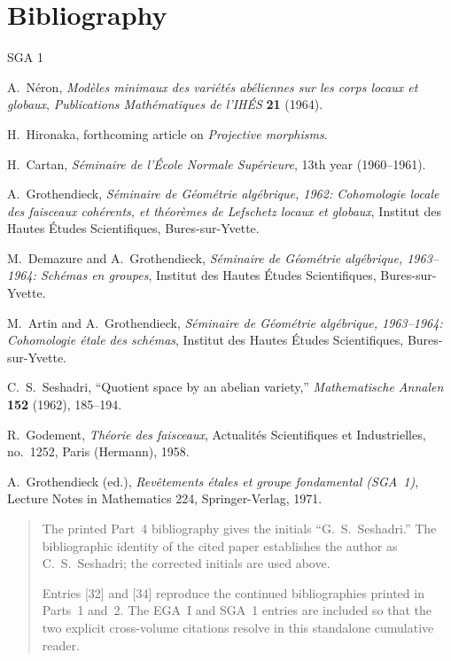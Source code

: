 \clearpage
{}
{}
\section*{Bibliography}

\begin{thebibliography}{SGA 1}

A.~N\'eron, \emph{Mod\`eles minimaux des vari\'et\'es ab\'eliennes sur les
corps locaux et globaux}, \emph{Publications Math\'ematiques de l'IH\'ES}
\textbf{21} (1964).

H.~Hironaka, forthcoming article on \emph{Projective morphisms}.

H.~Cartan, \emph{S\'eminaire de l'\'Ecole Normale Sup\'erieure},
13th year (1960--1961).

A.~Grothendieck, \emph{S\'eminaire de G\'eom\'etrie alg\'ebrique, 1962:
Cohomologie locale des faisceaux coh\'erents, et th\'eor\`emes de Lefschetz
locaux et globaux}, Institut des Hautes \'Etudes Scientifiques,
Bures-sur-Yvette.

M.~Demazure and A.~Grothendieck, \emph{S\'eminaire de G\'eom\'etrie
alg\'ebrique, 1963--1964: Sch\'emas en groupes}, Institut des Hautes
\'Etudes Scientifiques, Bures-sur-Yvette.

M.~Artin and A.~Grothendieck, \emph{S\'eminaire de G\'eom\'etrie
alg\'ebrique, 1963--1964: Cohomologie \'etale des sch\'emas}, Institut des
Hautes \'Etudes Scientifiques, Bures-sur-Yvette.

C.~S.~Seshadri, ``Quotient space by an abelian variety,''
\emph{Mathematische Annalen} \textbf{152} (1962), 185--194.

R.~Godement, \emph{Th\'eorie des faisceaux}, Actualit\'es Scientifiques et
Industrielles, no.~1252, Paris (Hermann), 1958.

A.~Grothendieck (ed.), \emph{Rev\^etements \'etales et groupe fondamental
(SGA~1)}, Lecture Notes in Mathematics 224, Springer-Verlag, 1971.

\end{thebibliography}

\begin{quote}\footnotesize
The printed Part~4 bibliography gives the initials ``G.~S.~Seshadri.''
The bibliographic identity of the cited paper establishes the author as
C.~S.~Seshadri; the corrected initials are used above.

Entries [32] and [34] reproduce the continued bibliographies printed in
Parts~1 and~2. The EGA~I and SGA~1 entries are included so that the two
explicit cross-volume citations resolve in this standalone cumulative reader.
\end{quote}
